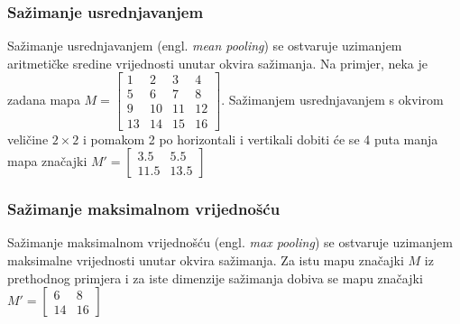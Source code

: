 \documentclass[times, utf8, zavrsni, numeric]{fer}
\begin{document}
\subsubsection{Sažimanje usrednjavanjem}
Sažimanje usrednjavanjem (engl. \textit{mean pooling}) se ostvaruje uzimanjem aritmetičke sredine vrijednosti unutar okvira sažimanja. Na primjer, neka je zadana mapa $M = \left[
\begin{matrix}
1 & 2 & 3 & 4 \\
5 & 6 & 7 & 8 \\ 
9 & 10 & 11 & 12 \\
13 & 14 & 15 & 16
\end{matrix} \right]
$.
Sažimanjem usrednjavanjem s okvirom veličine $2 \times 2$ i pomakom 2 po horizontali i vertikali dobiti će se 4 puta manja mapa značajki $M' = \left[
\begin{matrix}
3.5 & 5.5 \\
11.5 & 13.5
\end{matrix} \right]
$

\subsubsection{Sažimanje maksimalnom vrijednošću}
Sažimanje maksimalnom vrijednošću (engl. \textit{max pooling}) se ostvaruje uzimanjem maksimalne vrijednosti unutar okvira sažimanja. Za istu mapu značajki $M$ iz prethodnog primjera i za iste dimenzije sažimanja dobiva se mapu značajki $M' = \left[
\begin{matrix}
6 & 8 \\
14 & 16
\end{matrix} \right]
$
\end{document}
